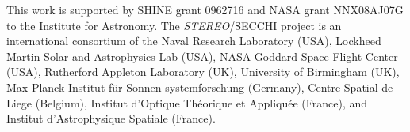 \documentclass[preprint2]{aastex}
\begin{document}
This work is supported by SHINE grant 0962716 and NASA grant NNX08AJ07G to the Institute for Astronomy. %
The \emph{STEREO}/SECCHI project is an international consortium of the Naval Research Laboratory (USA), Lockheed Martin Solar and Astrophysics Lab (USA), NASA Goddard Space Flight Center (USA), Rutherford Appleton Laboratory (UK), University of Birmingham (UK), Max-Planck-Institut f\"{u}r Sonnen-systemforschung (Germany), Centre Spatial de Liege (Belgium), Institut d'Optique Th\'{e}orique et Appliqu\'{e}e (France), and Institut d'Astrophysique Spatiale (France).




  
\end{document}
